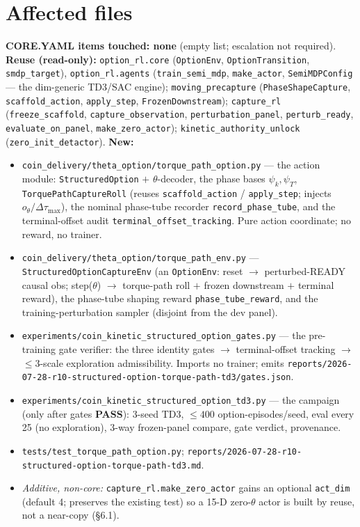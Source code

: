 \documentclass[11pt]{article}
\newcommand{\code}[1]{\texttt{\small #1}}
\newcommand{\ok}{\textcolor{green!50!black}{\textbf{PASS}}}
\newcommand{\slew}{\ensuremath{\Delta\tau_{\max}}}
\begin{document}
\section{Affected files}
\textbf{CORE.YAML items touched: none} (empty list; escalation not required). \textbf{Reuse (read-only):}
\code{option\_rl.core} (\code{OptionEnv}, \code{OptionTransition}, \code{smdp\_target}), \code{option\_rl.agents}
(\code{train\_semi\_mdp}, \code{make\_actor}, \code{SemiMDPConfig} --- the dim-generic TD3/SAC engine);
\code{moving\_precapture} (\code{PhaseShapeCapture}, \code{scaffold\_action}, \code{apply\_step}, \code{FrozenDownstream});
\code{capture\_rl} (\code{freeze\_scaffold}, \code{capture\_observation}, \code{perturbation\_panel},
\code{perturb\_ready}, \code{evaluate\_on\_panel}, \code{make\_zero\_actor}); \code{kinetic\_authority\_unlock}
(\code{zero\_init\_detactor}). \textbf{New:}
\begin{itemize}[nosep,leftmargin=1.4em]
  \item \code{coin\_delivery/theta\_option/torque\_path\_option.py} --- the action module: \code{StructuredOption} $+$
  $\theta$-decoder, the phase bases $\psi_k,\psi_T$, \code{TorquePathCaptureRoll} (reuses \code{scaffold\_action} /
  \code{apply\_step}; injects $o_\theta/\slew$), the nominal phase-tube recorder \code{record\_phase\_tube}, and the
  terminal-offset audit \code{terminal\_offset\_tracking}. Pure action coordinate; no reward, no trainer.
  \item \code{coin\_delivery/theta\_option/torque\_path\_env.py} --- \code{StructuredOptionCaptureEnv} (an
  \code{OptionEnv}: reset $\to$ perturbed-READY causal obs; step($\theta$) $\to$ torque-path roll $+$ frozen downstream $+$
  terminal reward), the phase-tube shaping reward \code{phase\_tube\_reward}, and the training-perturbation sampler
  (disjoint from the dev panel).
  \item \code{experiments/coin\_kinetic\_structured\_option\_gates.py} --- the pre-training gate verifier: the three
  identity gates $\to$ terminal-offset tracking $\to$ $\le3$-scale exploration admissibility. Imports no trainer; emits
  \code{reports/2026-07-28-r10-structured-option-torque-path-td3/gates.json}.
  \item \code{experiments/coin\_kinetic\_structured\_option\_td3.py} --- the campaign (only after gates \ok): 3-seed TD3,
  $\le400$ option-episodes/seed, eval every 25 (no exploration), 3-way frozen-panel compare, gate verdict, provenance.
  \item \code{tests/test\_torque\_path\_option.py}; \code{reports/2026-07-28-r10-structured-option-torque-path-td3.md}.
  \item \emph{Additive, non-core:} \code{capture\_rl.make\_zero\_actor} gains an optional \code{act\_dim} (default 4;
  preserves the existing test) so a 15-D zero-$\theta$ actor is built by reuse, not a near-copy (\S6.1).
\end{itemize}
\end{document}
